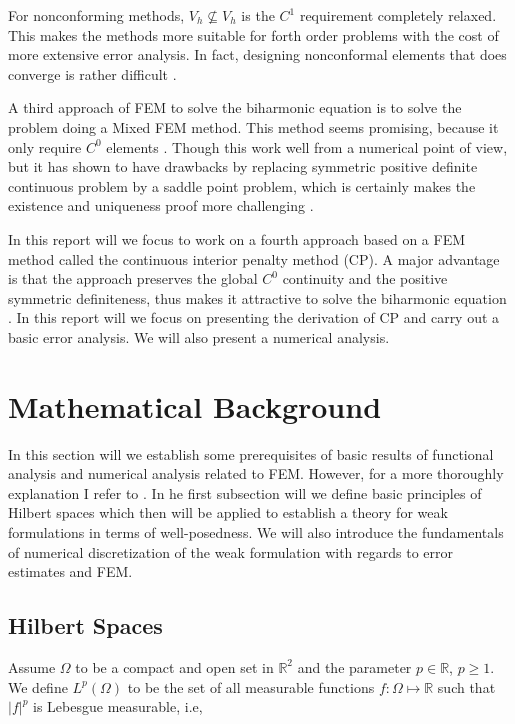 For nonconforming methods, $V_{h} \not \subseteq  V_{h}$ is the $C^{1}$ requirement completely relaxed. This makes the methods more suitable for forth order problems with the cost of more extensive error analysis. In fact, designing nonconformal
elements that does converge is rather difficult \cite{shi02, nair21}.

A third approach of FEM to solve the biharmonic equation is to solve the problem doing a Mixed FEM method. This method seems promising, because it only require $C^{0}$ elements \cite{chen08, brezzi91}.
Though this work well from a numerical point of view, but it has shown to have drawbacks by replacing symmetric positive definite continuous problem
by a saddle point problem, which is certainly makes the existence and uniqueness proof more challenging \cite{brezzi74}.

In this report will we focus to work on a fourth approach based on a FEM method called the continuous interior penalty method (CP). A major advantage is that the approach preserves the global $C^{0}$ continuity and the positive symmetric definiteness, thus makes it attractive to solve the biharmonic equation \cite{brenner2012, brenner2012quadratic}. In this report will we focus on presenting the derivation of CP and carry out a basic error analysis. We will also present a numerical analysis.


\section{Mathematical Background}%
\label{sub:mathematical_background}

In this section will we establish some prerequisites of basic results of functional analysis and numerical analysis related to FEM. However, for a more thoroughly explanation I refer to \cite{brenner07math,manzoni2021optimal, quartdiff}. In he first
subsection will we define basic principles of Hilbert spaces which then will be applied to establish a theory for weak formulations in terms of well-posedness. We will also introduce the fundamentals of numerical discretization of the weak formulation with regards to error estimates and FEM.

\subsection{Hilbert Spaces}%
\label{sub:hilbert_spaces}

Assume $\Omega $  to be a compact and open set in $\mathbb{R} ^{2}$ and the parameter $p \in \mathbb{R} $, $p\ge 1$. We define $L^{p}\left( \Omega  \right) $ to be the set of all measurable functions $f: \Omega  \mapsto \mathbb{R} $ such that
$\left\lvert f \right\rvert ^{p}$ is Lebesgue measurable, i.e,

